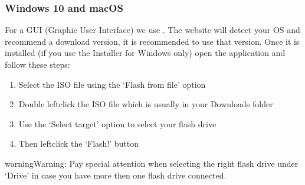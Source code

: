 \documentclass[letterpaper,10pt,english]{sphinxmanual}
\begin{document}
\subsubsection{Windows 10 and macOS}
\label{\detokenize{docs/installation:windows-10-and-macos}}
\sphinxAtStartPar
For a GUI (Graphic User Interface) we use . The website will detect your OS and recommend a download version, it is recommended to use that version.
Once it is installed (if you use the Installer for Windows only) open the application and follow these steps:
\begin{enumerate}
%
\item {} 
\sphinxAtStartPar
Select the ISO file using the ‘Flash from file’ option

\item {} 
\sphinxAtStartPar
Double left\sphinxhyphen{}click the ISO file which is usually in your Downloads folder

\item {} 
\sphinxAtStartPar
Use the ‘Select target’ option to select your flash drive

\item {} 
\sphinxAtStartPar
Then left\sphinxhyphen{}click the ‘Flash!’ button

\end{enumerate}

\begin{sphinxadmonition}{warning}{Warning:}
\sphinxAtStartPar
Pay special attention when selecting the right flash drive under ‘Drive’ in case you have more then one flash drive connected.
\end{sphinxadmonition}
\end{document}
